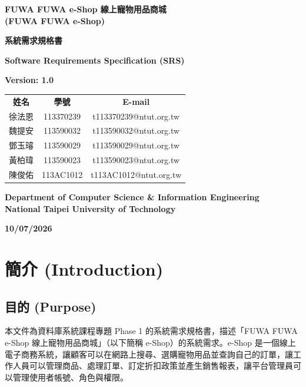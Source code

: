 \documentclass[12pt,a4paper]{article}
\newcommand{\projectname}{FUWA FUWA e-Shop 線上寵物用品商城}
\newcommand{\projectnameEN}{FUWA FUWA e-Shop}
\newcommand{\docdate}{10/07/2026}
\begin{document}
\begin{titlepage}
\centering
\vspace*{1.5cm}
{\Large\bfseries \projectname\\[0.3em] (\projectnameEN)\par}
\vspace{1.5cm}
{\LARGE\bfseries 系統需求規格書\par}
\vspace{0.5cm}
{\Large\bfseries Software Requirements Specification (SRS)\par}
\vspace{0.5cm}
{\large\bfseries Version: 1.0\par}
\vspace{1.2cm}
\renewcommand{\arraystretch}{1.4}
\begin{tabular}{ccc}
\textbf{姓名} & \textbf{學號} & \textbf{E-mail}\\
徐法恩 & 113370239 & t113370239@ntut.org.tw\\
魏提安 & 113590032 & t113590032@ntut.org.tw\\
鄧玉璿 & 113590029 & t113590029@ntut.org.tw\\
黃柏瑋 & 113590023 & t113590023@ntut.org.tw\\
陳俊佑 & 113AC1012 & t113AC1012@ntut.org.tw\\
\end{tabular}
\vfill
{\large\bfseries Department of Computer Science \& Information Engineering\\
National Taipei University of Technology\par}
\vspace{1cm}
{\large\bfseries \docdate\par}
\vspace*{1cm}
\end{titlepage}

\setcounter{page}{1}
\tableofcontents
\clearpage
{}
\setcounter{page}{1}

\section{簡介 (Introduction)}

\subsection{目的 (Purpose)}
本文件為資料庫系統課程專題 Phase 1 的系統需求規格書，描述「\projectname」（以下簡稱 e-Shop）的系統需求。e-Shop 是一個線上電子商務系統，讓顧客可以在網路上搜尋、選購寵物用品並查詢自己的訂單，讓工作人員可以管理商品、處理訂單、訂定折扣政策並產生銷售報表，讓平台管理員可以管理使用者帳號、角色與權限。
\end{document}
